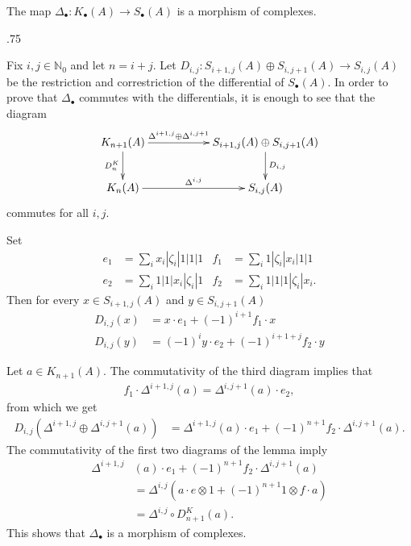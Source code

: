\documentclass[11pt,fleqn]{article}
\makeatletter
\renewenvironment{proof}[1][\proofname]{\par
  \pushQED{\qed}%
  \normalfont \topsep.75\paraskip\relax
  \trivlist
  \item[\hskip\labelsep
        \itshape
    #1\@addpunct{.}]\ignorespaces
}{%
  \popQED\endtrivlist\@endpefalse
}
\newcommand\NN{\mathbb N}
\newcommand\ot{\otimes}
\renewcommand\to{\longrightarrow}
\makeatother
\begin{document}
\begin{Proposition*}
The map $\Delta_\bullet: K_\bullet(A) \to S_\bullet(A)$ is a morphism of complexes.
\end{Proposition*}
\begin{proof}
Fix $i,j \in \NN_0$ and let $n = i+j$. Let $D_{i,j}: S_{i+1,j}(A) \oplus S_{i,j+1}(A) \to
S_{i,j}(A)$ be the restriction and correstriction of the differential of $S_\bullet(A)$. 
In order to prove that $\Delta_\bullet$ commutes with the differentials, it is enough to
see that the diagram
\begin{align*}
\xymatrix{
	K_{n+1}(A) 
		\ar[rr]^-{\Delta^{i+1,j}\oplus \Delta^{i,j+1}} \ar[d]_-{D^K_n}
	&& S_{i+1,j}(A) \oplus S_{i,j+1}(A)
		\ar[d]^-{D_{i,j}} \\
	K_{n}(A)
		\ar[rr]^-{\Delta^{i,j}} 
	&& S_{i,j}(A)
}
\end{align*}
commutes for all $i,j$.

Set
\begin{align*}
	e_1 &= \sum_i x_i| \zeta_i|1|1|1 
	& f_1 &= \sum_i 1| \zeta_i |x_i|1|1 \\
	e_2 &= \sum_i 1|1|x_i| \zeta_i|1 
	& f_2 &= \sum_i 1|1|1| \zeta_i |x_i.
\end{align*}
Then for every $x \in S_{i+1,j}(A)$ and $y \in S_{i,j+1}(A)$
\begin{align*}
D_{i,j}(x) &= x \cdot e_1 + (-1)^{i+1} f_1 \cdot x \\
D_{i,j}(y) &= (-1)^i y \cdot e_2 + (-1)^{i+1+j} f_2 \cdot y
\end{align*}

Let $a \in K_{n+1}(A)$. The commutativity of the third diagram implies that
\begin{align*}
f_1 \cdot \Delta^{i+1,j}(a) = \Delta^{i,j+1}(a) \cdot e_2,
\end{align*}
from which we get
\begin{align*}
D_{i,j}(\Delta^{i+1,j} \oplus \Delta^{i,j+1}(a)) 
	&= \Delta^{i+1,j}(a) \cdot e_1 
		+ (-1)^{n+1} f_2 \cdot \Delta^{i,j+1}(a).
\end{align*}
The commutativity of the first two diagrams of the lemma imply
\begin{align*}
\Delta^{i+1,j}&(a) \cdot e_1 
		+ (-1)^{n+1} f_2 \cdot \Delta^{i,j+1}(a) \\
	&= \Delta^{i,j}(a \cdot e \ot 1 + (-1)^{n+1} 1 \ot f \cdot a)\\
	&= \Delta^{i,j} \circ D_{n+1}^K(a).
\end{align*}
This shows that $\Delta_\bullet$ is a morphism of complexes.
\end{proof}
\end{document}
